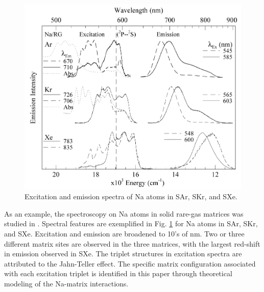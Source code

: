 \begin{figure} %
        \centering
                \includegraphics[width=.7\textwidth]{figures/Na_in_matrices.png}
                \caption{Excitation and emission spectra of Na atoms in SAr, SKr, and SXe.  \cite{matrixNa}}
\label{fig:matrixNa}
\end{figure}

As an example, the spectroscopy on Na atoms in solid rare-gas matrices was studied in \cite{matrixNa}.  Spectral features are exemplified in Fig. \ref{fig:matrixNa} for Na atoms in SAr, SKr, and SXe.  Excitation and emission are broadened to 10's of nm.  Two or three different matrix sites are observed in the three matrices, with the largest red-shift in emission observed in SXe.  The triplet structures in excitation spectra are attributed to the Jahn-Teller effect.  The specific matrix configuration associated with each excitation triplet is identified in this paper through theoretical modeling of the Na-matrix interactions.


